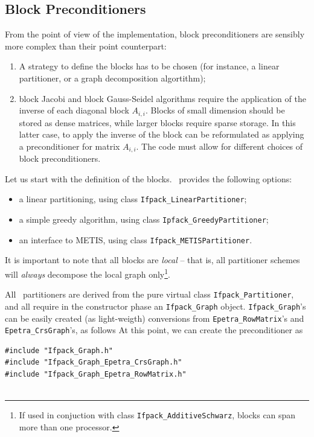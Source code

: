 {\subsection{Block Preconditioners}
\label{sec:block_ex}

From the point of view of the implementation, block preconditioners
are sensibly more complex than their point counterpart:
\begin{enumerate}
\item A strategy to define the blocks has to be chosen (for instance, 
a linear partitioner, or a graph decomposition algortithm);
\item block Jacobi and block Gauss-Seidel algorithms require the application
of the inverse of each diagonal block $A_{i,i}$. Blocks of small dimension
should be stored as dense matrices, while larger blocks require sparse
storage. In this latter case, to apply the inverse of the block can be
reformulated as applying a preconditioner for matrix
$A_{i,i}$.
The code must allow for different choices of block preconditioners.
\end{enumerate}

\smallskip

Let us start with the definition of the blocks. 
\ifpack\ provides the following options:
\begin{itemize}
\item a linear partitioning, using class \verb!Ifpack_LinearPartitioner!;
\item a simple greedy algorithm, using class \verb!Ipfack_GreedyPartitioner!;
\item an interface to METIS, using class \verb!Ifpack_METISPartitioner!.
\end{itemize}
It is important to note that all blocks are {\sl local} -- that is, 
  all partitioner schemes will {\sl always} decompose the local graph 
  only\footnote{If used in conjuction with class {\tt Ifpack\_AdditiveSchwarz},
    blocks can span more than one processor.}.

All \ifpack\ partitioners are derived from the pure virtual class
\verb!Ifpack_Partitioner!, and all require in the constructor phase
an \verb!Ifpack_Graph! object. \verb!Ifpack_Graph!'s can be easily
created (as light-weigth) conversions from \verb!Epetra_RowMatrix!'s
and \verb!Epetra_CrsGraph!'s, as follows At this point, we can create the
preconditioner as
\begin{verbatim}
#include "Ifpack_Graph.h"
#include "Ifpack_Graph_Epetra_CrsGraph.h"
#include "Ifpack_Graph_Epetra_RowMatrix.h"


\end{verbatim}}
